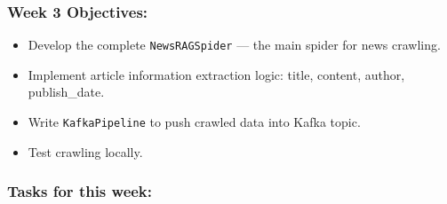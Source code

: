 \hypertarget{week-3-objectives}{%
\subsubsection{Week 3 Objectives:}}

\begin{itemize}
\tightlist
\item
  Develop the complete \texttt{NewsRAGSpider} --- the main spider for
  news crawling.
\item
  Implement article information extraction logic: title, content,
  author, publish\_date.
\item
  Write \texttt{KafkaPipeline} to push crawled data into Kafka topic.
\item
  Test crawling locally.
\end{itemize}

\hypertarget{tasks-for-this-week}{%
\subsubsection{Tasks for this week:}}

